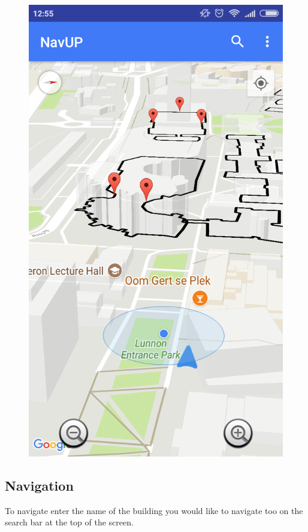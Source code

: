\documentclass{article}
\begin{document}
\newpage 

\begin{figure}[h!]
\centering
\includegraphics[scale=0.15]{3dmap.png}
\end{figure}

\subsection{Navigation}
To navigate enter the name of the building you would like to navigate too on the search bar at the top of the screen. 
\end{document}
